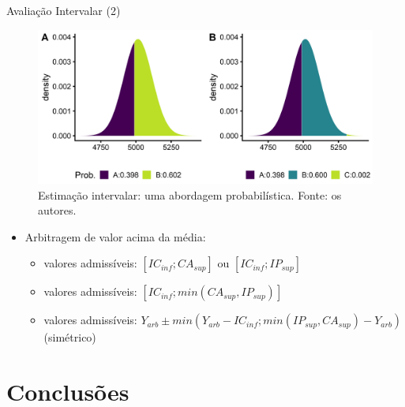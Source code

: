\documentclass[9pt,ignorenonframetext,aspectratio=169]{beamer}
\providecommand{\tightlist}{%
  \setlength{\itemsep}{0pt}\setlength{\parskip}{0pt}}
\begin{document}
\begin{frame}{Avaliação Intervalar (2)}
\protect\hypertarget{avaliauxe7uxe3o-intervalar-2}{}

\begin{figure}

{\centering \includegraphics[width=0.7\linewidth]{../../images/dists-1} 

}

\caption{Estimação intervalar: uma abordagem probabilística. Fonte: os autores.}\label{fig:unnamed-chunk-11}
\end{figure}

\begin{itemize}[<+->]
\tightlist
\item
  Arbitragem de valor acima da média:

  \begin{itemize}[<+->]
  \tightlist
  \item
    valores admissíveis: \([IC_{inf}; CA_{sup}]\) ou
    \([IC_{inf}; IP_{sup}]\)
  \item
    valores admissíveis: \([IC_{inf}; min(CA_{sup}, IP_{sup})]\)
  \item
    valores admissíveis:
    \(Y_{arb} \pm min(Y_{arb} - IC_{inf}; min(IP_{sup}, CA_{sup}) - Y_{arb})\)
    (simétrico)
  \end{itemize}
\end{itemize}

\end{frame}

\hypertarget{conclusuxf5es}{%
\section{Conclusões}\label{conclusuxf5es}}
\end{document}
